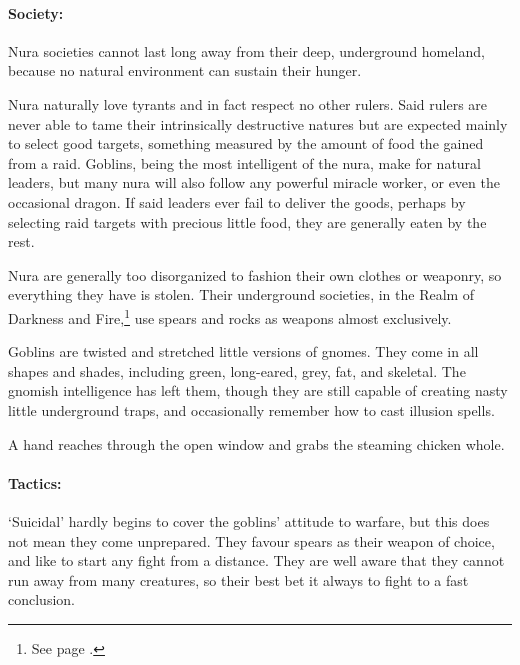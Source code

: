 \begin{multicols}{2}
\paragraph{Society:}
Nura societies cannot last long away from their deep, underground homeland, because no natural environment can sustain their hunger.

Nura naturally love tyrants and in fact respect no other rulers.
Said rulers are never able to tame their intrinsically destructive natures but are expected mainly to select good targets, something measured by the amount of food the gained from a raid.
Goblins, being the most intelligent of the nura, make for natural leaders, but many nura will also follow any powerful miracle worker, or even the occasional dragon.
If said leaders ever fail to deliver the goods, perhaps by selecting raid targets with precious little food, they are generally eaten by the rest.

Nura are generally too disorganized to fashion their own clothes or weaponry, so everything they have is stolen.
Their underground societies, in the Realm of Darkness and Fire,\footnote{See page \pageref{darknessandfire}.} use spears and rocks as weapons almost exclusively.
\label{goblin}

Goblins are twisted and stretched little versions of gnomes.
They come in all shapes and shades, including green, long-eared, grey, fat, and skeletal.
The gnomish intelligence has left them, though they are still capable of creating nasty little underground traps, and occasionally remember how to cast illusion spells.

\begin{boxtext}

  A hand reaches through the open window and grabs the steaming chicken whole.

\end{boxtext}

\paragraph{Tactics:} `Suicidal' hardly begins to cover the goblins' attitude to warfare, but this does not mean they come unprepared.
They favour spears as their weapon of choice, and like to start any fight from a distance.
They are well aware that they cannot run away from many creatures, so their best bet it always to fight to a fast conclusion.

\begin{boxtext}


\end{boxtext}
\end{multicols}
